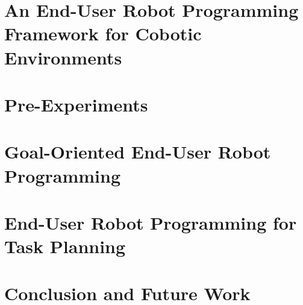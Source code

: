 \documentclass[a4paper,12pt,twoside,openany]{book}
\theoremstyle{definition}
\theoremstyle{remark}
\begin{document}
\chapter{An End-User Robot Programming Framework for Cobotic Environments}\label{chap:Contribution}


\cleardoublepage
\chapter{Pre-Experiments}\label{chap:Pre-Experiments}
\minitoc


\cleardoublepage
\chapter{Goal-Oriented End-User Robot Programming}\label{chap:OrganisingTasks}
\minitoc%


\cleardoublepage
\chapter{End-User Robot Programming for Task Planning}\label{chap:Implementation}
\minitoc%





\cleardoublepage
\chapter{Conclusion and Future Work}\label{chap:Conclusion}
\minitoc%



\cleardoublepage
{}


\appendix

\end{document}
